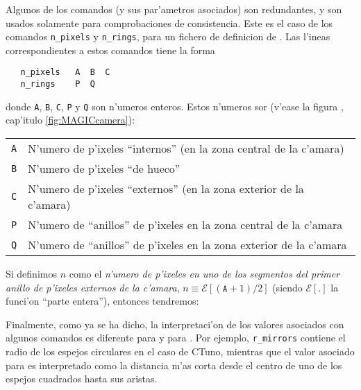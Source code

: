 \ctdefkeywordstbl

\mirrordefCTunotbl

\mirrordefMAGICtbl

Algunos de los comandos (y sus par'ametros asociados) son redundantes,
y son usados solamente para comprobaciones de consistencia. Este es el
caso de los comandos 
\texttt{n\_pixels} y \texttt{n\_rings}, para un fichero de definicion
de \MAGIC.  Las l'ineas correspondientes a estos comandos tiene la forma
%
\begin{verbatim}
   n_pixels   A  B  C
   n_rings    P  Q  
\end{verbatim}
%
donde \texttt{A}, \texttt{B}, \texttt{C}, \texttt{P} y \texttt{Q} son
n'umeros enteros. Estos n'umeros sor (v'ease la figura
, cap'itulo \ref{fig:MAGICcamera}):\\
%
\begin{center}
\begin{tabular}{cl}
\texttt{A} & N'umero de p'ixeles ``internos'' (en la zona central de
la c'amara)\\
\texttt{B} & N'umero de p'ixeles ``de hueco''\\
\texttt{C} & N'umero de p'ixeles ``externos'' (en la zona exterior de
la c'amara)\\
\texttt{P} & N'umero de ``anillos'' de p'ixeles en la zona central de
la c'amara\\
\texttt{Q} & N'umero de ``anillos'' de p'ixeles en la zona exterior de
la c'amara\\
\end{tabular}
\end{center}
%
Si definimos $n$ como el \emph{n'umero de p'ixeles en uno de los
  segmentos del primer anillo de p'ixeles externos de la c'amara}, $ n
\equiv \mathcal{E}[(\texttt{A}+1)/2]$ (siendo $\mathcal{E}[\mathord{.}]$
la funci'on ``parte entera''), entonces tendremos:
%
\calcnpixelseq

Finalmente, como ya se ha dicho, la interpretaci'on de los valores
asociados con algunos comandos es diferente para \MAGIC y para
\CTuno.  Por ejemplo, 
\texttt{r\_mirrors} contiene el radio de los espejos circulares en el
caso de CTuno, mientras que el valor asociado para \MAGIC es
interpretado como la distancia m'as corta desde el centro de uno de
los espejos cuadrados hasta sus aristas.

